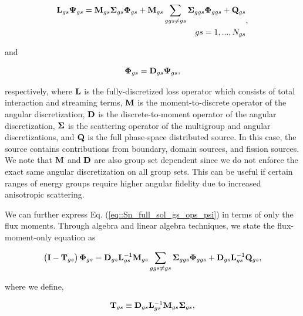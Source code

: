 \begin{equation}
\label{eq::Sn_full_sol_gs_ops_psi}
\begin{aligned}
{\bf L}_{gs} {\bf \Psi}_{gs} =    {\bf M}_{gs} {\bf \Sigma}_{gs} {\bf \Phi}_{gs} + {\bf M}_{gs} \sum\displaylimits_{ggs \neq gs}  {\bf \Sigma}_{ggs} {\bf \Phi}_{ggs}+ {\bf Q}_{gs}  \\
gs=1,...,N_{gs}
\end{aligned} ,
\end{equation}

\noindent and

\begin{equation}
\label{eq::Sn_full_sol_gs_ops_phi}
{\bf \Phi}_{gs} =  {\bf D}_{gs} {\bf \Psi}_{gs} ,
\end{equation}

\noindent respectively, where ${\bf L}$ is the fully-discretized loss operator which consists of total interaction and streaming terms, ${\bf M}$ is the moment-to-discrete operator of the angular discretization, ${\bf D}$ is the discrete-to-moment operator of the angular discretization, ${\bf \Sigma}$ is the scattering operator of the multigroup and angular discretizations, and ${\bf Q}$ is the full phase-space distributed source. In this case, the source contains contributions from boundary, domain sources, and fission sources. We note that ${\bf M}$ and ${\bf D}$ are also group set dependent since we do not enforce the exact same angular discretization on all group sets. This can be useful if certain ranges of energy groups require higher angular fidelity due to increased anisotropic scattering.

We can further express Eq. (\ref{eq::Sn_full_sol_gs_ops_psi}) in terms of only the flux moments. Through algebra and linear algebra techniques, we state the flux-moment-only equation as

\begin{equation}
\label{eq::Sn_full_sol_moments_only}
\left( {\bf I} -{\bf T}_{gs} \right) {\bf \Phi}_{gs} = {\bf D}_{gs} {\bf L}_{gs}^{-1}  {\bf M}_{gs} \sum\displaylimits_{ggs \neq gs}  {\bf \Sigma}_{ggs} {\bf \Phi}_{ggs} +  {\bf D}_{gs} {\bf L}_{gs}^{-1}  {\bf Q}_{gs} ,
\end{equation}

\noindent where we define,

\begin{equation}
\label{eq::Sn_trans_op_T}
{\bf T}_{gs} \equiv {\bf D}_{gs} {\bf L}_{gs}^{-1}{\bf M}_{gs} {\bf \Sigma}_{gs} ,
\end{equation}

